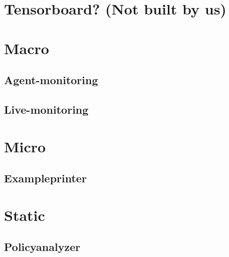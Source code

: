 \section{Tensorboard? (Not built by us)}
\section{Macro}
\subsection{Agent-monitoring}
\subsection{Live-monitoring}
\section{Micro}
\subsection{Exampleprinter}
\section{Static}
\subsection{Policyanalyzer}